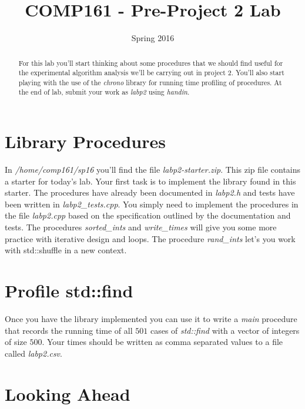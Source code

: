 \documentclass[]{tufte-handout}
\title{COMP161 - Pre-Project 2 Lab}
\author{}
\date{Spring 2016}
\begin{document}
\maketitle

\begin{abstract}
For this lab you'll start thinking about some procedures that we should find useful for the experimental algorithm analysis we'll be carrying out in project 2. You'll also start playing with the use of the \textit{chrono} library for running time profiling of procedures. At the end of lab, submit your work as \textit{labp2} using \textit{handin}. 
\end{abstract}

\section{ Library Procedures }

In \textit{/home/comp161/sp16} you'll find the file \textit{labp2-starter.zip}. This zip file contains a starter for today's lab. Your first task is to implement the library found in this starter. The procedures have already been documented in \textit{labp2.h} and tests have been written in \textit{labp2\_tests.cpp}. You simply need to implement the procedures in the file \textit{labp2.cpp} based on the specification outlined by the documentation and tests.  The procedures \textit{sorted\_ints} and \textit{write\_times} will give you some more practice with iterative design and loops. The procedure \textit{rand\_ints} let's you work with std::shuffle in a new context.

\section{ Profile std::find }

Once you have the library implemented you can use it to write a \textit{main} procedure that records the running time of all $501$ cases of \textit{std::find} with a vector of integers of size $500$. Your times should be written as comma separated values to a file called \textit{labp2.csv}.  

\section{Looking Ahead}
\end{document}
